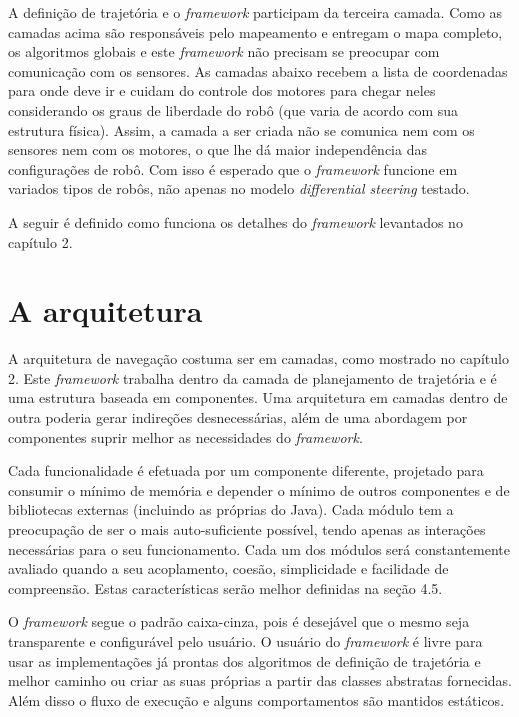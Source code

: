 A definição de trajetória e o \textit{framework} participam da terceira camada. Como as camadas acima são responsáveis pelo mapeamento e entregam o mapa completo, os algoritmos globais e este \textit{framework} não precisam se preocupar com comunicação com os sensores. As camadas abaixo recebem a lista de coordenadas para onde deve ir e cuidam do controle dos motores para chegar neles considerando os graus de liberdade do robô (que varia de acordo com sua estrutura física). Assim, a camada a ser criada não se comunica nem com os sensores nem com os motores, o que lhe dá maior independência das configurações de robô. Com isso é esperado que o \textit{framework} funcione em variados tipos de robôs, não apenas no modelo \textit{differential steering} testado.

A seguir é definido como funciona os detalhes do \textit{framework} levantados no capítulo 2.

\section{A arquitetura}

A arquitetura de navegação costuma ser em camadas, como mostrado no capítulo 2. Este \textit{framework} trabalha dentro da camada de planejamento de trajetória e é uma estrutura baseada em componentes. Uma arquitetura em camadas dentro de outra poderia gerar indireções desnecessárias, além de uma abordagem por componentes suprir melhor as necessidades do \textit{framework}.

Cada funcionalidade é efetuada por um componente diferente, projetado para consumir o mínimo de memória e depender o mínimo de outros componentes e de bibliotecas externas (incluindo as próprias do Java). Cada módulo tem a preocupação de ser o mais auto-suficiente possível, tendo apenas as interações necessárias para o seu funcionamento. Cada um dos módulos será constantemente avaliado quando a seu acoplamento, coesão,  simplicidade e facilidade de compreensão. Estas características serão melhor definidas na seção 4.5.

O \textit{framework} segue o padrão caixa-cinza, pois é desejável que o mesmo seja transparente e configurável pelo usuário. O usuário do \textit{framework} é livre para usar as implementações já prontas dos algoritmos de definição de trajetória e melhor caminho ou criar as suas próprias a partir das classes abstratas fornecidas. Além disso o fluxo de execução e alguns comportamentos são mantidos estáticos.

